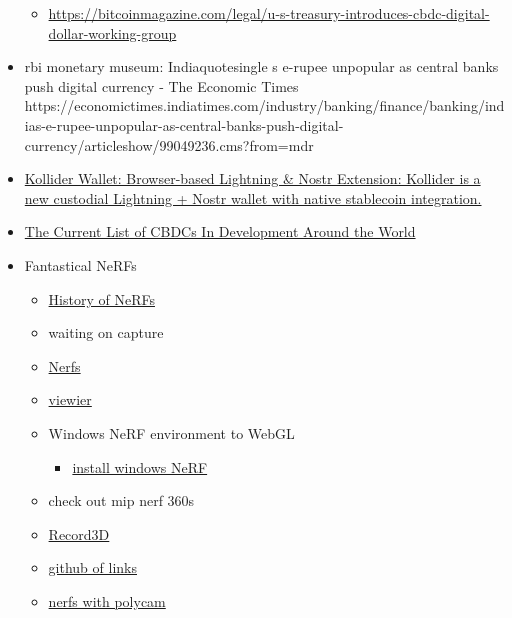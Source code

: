 \begin{itemize}
\begin{itemize}
  \item
    \url{https://bitcoinmagazine.com/legal/u-s-treasury-introduces-cbdc-digital-dollar-working-group}
  \end{itemize}
\item
  rbi monetary museum: Indiaquotesingle s e-rupee unpopular as
  central banks push digital currency - The Economic Times
  https://economictimes.indiatimes.com/industry/banking/finance/banking/indias-e-rupee-unpopular-as-central-banks-push-digital-currency/articleshow/99049236.cms?from=mdr
\item
  \href{https://www.nobsbitcoin.com/kollider-wallet/}{Kollider Wallet:
  Browser-based Lightning \& Nostr Extension: Kollider is a new
  custodial Lightning + Nostr wallet with native stablecoin
  integration.}
\item
  \href{https://www.atlanticcouncil.org/cbdctracker/}{The Current List
  of CBDCs In Development Around the World}
\item
  Fantastical NeRFs

  \begin{itemize}
  \item
    \href{https://neuralradiancefields.io/history-of-neural-radiance-fields/}{History
    of NeRFs}
  \item
    waiting on capture
  \item
    \href{https://www.matthewtancik.com/nerf}{Nerfs}
  \item
    \href{https://github.com/sxyu/volrend}{viewier}
  \item
    Windows NeRF environment to WebGL

    \begin{itemize}
     
    \item
      \href{https://github.com/bycloudai/instant-ngp-Windows}{install
      windows NeRF}
    \end{itemize}
  \item
    check out mip nerf 360s
  \item
    \href{https://github.com/marek-simonik/record3d_unity_streaming}{Record3D}
  \item
    \href{https://github.com/yenchenlin/awesome-NeRF}{github of links}
  \item
    \href{https://www.linkedin.com/posts/robcsloan_nerfstudio-nerfstudio-polycam-activity-6999169160379297792-SN4F?utm_source=share\&utm_medium=member_desktop}{nerfs
    with polycam}

    \begin{itemize}
     

\end{itemize}
\end{itemize}
\end{itemize}
